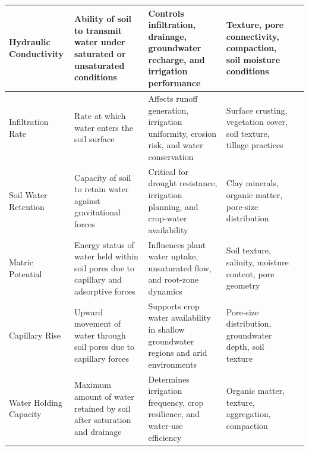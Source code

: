 \documentclass[land,article,submit,pdftex,moreauthors]{Definitions/mdpi}
\numberwithin{equation}{section}
\begin{document}
\begin{longtable}{@{\extracolsep{\fill}} p{} p{} p{} p{} p{} @{}}
Hydraulic Conductivity &
Ability of soil to transmit water under saturated or unsaturated conditions &
Controls infiltration, drainage, groundwater recharge, and irrigation performance &
Texture, pore connectivity, compaction, soil moisture conditions &
\citep{Mualem1976, VanGenuchten1980} \\ \hline

Infiltration Rate &
Rate at which water enters the soil surface &
Affects runoff generation, irrigation uniformity, erosion risk, and water conservation &
Surface crusting, vegetation cover, soil texture, tillage practices &
\citep{Assouline2011, Philip1957, Green1911, w10111581} \\ \hline

Soil Water Retention &
Capacity of soil to retain water against gravitational forces &
Critical for drought resistance, irrigation planning, and crop-water availability &
Clay minerals, organic matter, pore-size distribution &
\citep{Gamagedara2025, VanGenuchten1980, Hodnett2002, Vereecken1989} \\ \hline

Matric Potential &
Energy status of water held within soil pores due to capillary and adsorptive forces &
Influences plant water uptake, unsaturated flow, and root-zone dynamics &
Soil texture, salinity, moisture content, pore geometry &
\citep{Gamagedara2025, Richards1931, Dane2002} \\ \hline

Capillary Rise &
Upward movement of water through soil pores due to capillary forces &
Supports crop water availability in shallow groundwater regions and arid environments &
Pore-size distribution, groundwater depth, soil texture &
\citep{hydrology12030055, Gardner1958, ALI2026, app13063374} \\ \hline

Water Holding Capacity &
Maximum amount of water retained by soil after saturation and drainage &
Determines irrigation frequency, crop resilience, and water-use efficiency &
Organic matter, texture, aggregation, compaction &
\citep{Barik2020, flint2018increasing, Hudson1994, Rawls2003} \\

\end{longtable}
\normalsize
\end{document}

